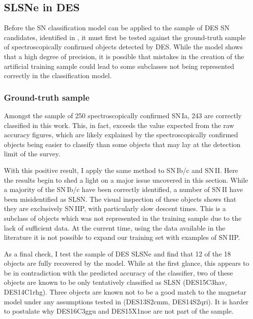 \subsection{SLSNe in DES}
Before the SN classification model can be applied to the sample of DES SN candidates, identified in , it must first be tested against the ground-truth sample of spectroscopically confirmed objects detected by DES. While the model shows that a high degree of precision, it is possible that mistakes in the creation of the artificial training sample could lead to some subclasses not being represented correctly in the classification model.

\subsubsection{Ground-truth sample} \label{sec:SNTruth}
Amongst the sample of 250 spectroscopically confirmed SN\,Ia, 243 are correctly classified in this work. This, in fact, exceeds the value expected from the raw accuracy figures, which are likely explained by the spectroscopically confirmed objects being easier to classify than some objects that may lay at the detection limit of the survey.

With this positive result, I apply the same method to SN\,Ib/c and SN\,II. Here the results begin to shed a light on a major issue uncovered in this section. While a majority of the SN\,Ib/c have been correctly identified, a number of SN\,II have been misidentified as SLSN. The visual inspection of these objects shows that they are exclusively SN\,IIP, with particularly slow descent times. This is a subclass of objects which was not represented in the training sample due to the lack of sufficient data. At the current time, using the data available in the literature it is not possible to expand our training set with examples of SN\,IIP.

As a final check, I test the sample of DES SLSNe and find that 12 of the 18 objects are fully recovered by the model. While at the first glance, this appears to be in contradiction with the predicted accuracy of the classifier, two of these objects are known to be only tentatively classified as SLSN (DES15C3hav, DES14C1rhg). Three objects are known not to be a good match to the magnetar model under any assumptions tested in  (DES13S2cmm, DES14S2qri). It is harder to postulate why DES16C3ggu and DES15X1noe are not part of the sample.

